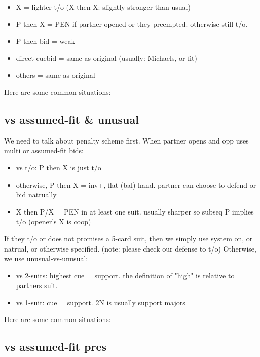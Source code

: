 \begin{itemize}
    \setlength\itemsep{0pt}
    \item X = lighter t/o  (X then X: slightly stronger than usual)
    \item P then X = PEN if partner opened or they preempted. otherwise still t/o.
    \item P then bid = weak
    \item direct cuebid = same as original (usually: Michaels, or fit)
    \item others = same as original
\end{itemize}

Here are some common situations:


\subsection{vs assumed-fit \& unusual}

We need to talk about penalty scheme first. When partner opens and opp uses multi or assumed-fit bids:
\begin{itemize}
    \setlength\itemsep{0pt}
    \item vs t/o: P then X is just t/o
    \item otherwise, P then X = inv+, flat (bal) hand. partner can choose to defend or bid natrually
    \item X then P/X = PEN in at least one suit. usually sharper so subseq P implies t/o (opener's X is coop)
\end{itemize}

If they t/o or does not promises a 5-card suit, then we simply use system on, or natrual, or otherwise specified. (note: please check our defense to t/o)
Otherwise, we use unusual-vs-unusual:

\begin{itemize}
    \setlength\itemsep{0pt}
    \item vs 2-suits: highest cue = support. the definition of "high" is relative to partners suit.
    \item vs 1-suit: cue = support. 2N is usually support majors
\end{itemize}

Here are some common situations:



\subsection{vs assumed-fit pres}

